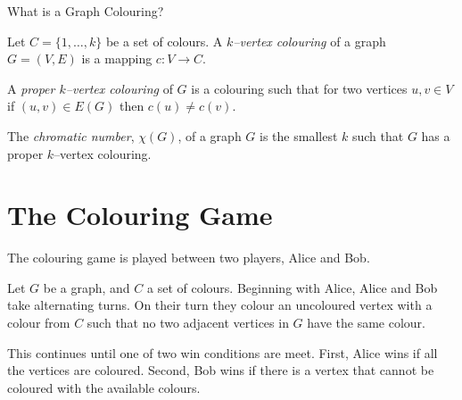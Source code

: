 \documentclass{beamer}
\begin{document}

\begin{frame}{\secname}{What is a Graph Colouring?}
    
    Let $C=\{1,\dots,k\}$ be a set of colours. A \textit{$k$--vertex colouring} of a graph $G=(V,E)$ is a mapping $c\colon V \to C$. 
    
    \bigskip
    
    A \textit{proper $k$--vertex colouring} of $G$ is a colouring such that for two vertices $u,v\in V$ if $(u,v)\in E(G)$ then $c(u)\neq c(v)$.
    
    \bigskip
    
    The \textit{chromatic number}, $\chi(G)$, of a graph $G$ is the smallest $k$ such that $G$ has a proper $k$--vertex colouring.
\end{frame}


\section{The Colouring Game}


\begin{frame}{\secname} 
        
        
    
    The colouring game is played between two players, Alice and Bob.
    
    \bigskip
    
    Let $G$ be a graph, and $C$ a set of colours. Beginning with Alice, Alice and Bob take alternating turns. On their turn they colour an uncoloured vertex with a colour from $C$ such that no two adjacent vertices in $G$ have the same colour. 
    
    \bigskip
    
    This continues until one of two win conditions are meet. First, Alice wins if all the vertices are coloured. Second, Bob wins if there is a vertex that cannot be coloured with the available colours.
\end{frame}

\end{document}
